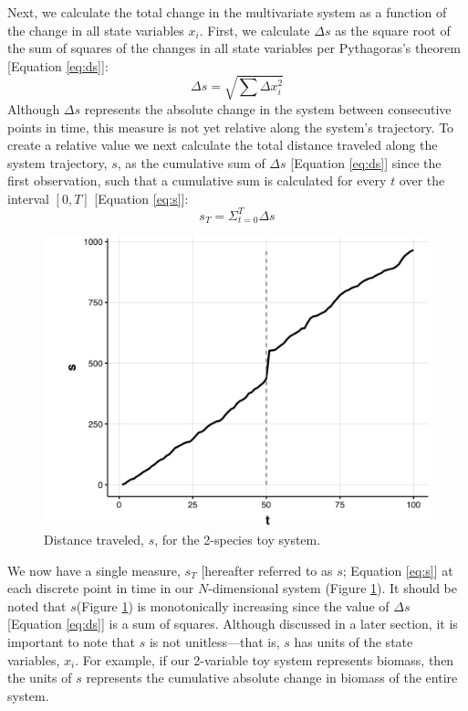 \documentclass[print]{nuthesis}
\begin{document}
Next, we calculate the total change in the multivariate system as a function of the change in all state variables \(x_i\). First, we calculate \(\Delta s\) as the square root of the sum of squares of the changes in all state variables per Pythagoras's theorem {[}Equation \eqref{eq:ds}{]}:
\begin{equation}
\Delta s = \sqrt{\sum{\Delta x_i^2}}
\label{eq:ds}
\end{equation}
Although \(\Delta s\) represents the absolute change in the system between consecutive points in time, this measure is not yet relative along the system's trajectory. To create a relative value we next calculate the total distance traveled along the system trajectory, \(s\), as the cumulative sum of \(\Delta s\) {[}Equation \eqref{eq:ds}{]} since the first observation, such that a cumulative sum is calculated for every \(t\) over the interval \([0,T]\) {[}Equation \eqref{eq:s}{]}:
\begin{equation}
s_T = \Sigma_{t=0}^{T}{\Delta s}
  \label{eq:s}
\end{equation}
\begin{figure}
\includegraphics[width=0.85\linewidth]{./chapterFiles/velocity/figsCalledInDiss/sysExs} \caption{Distance traveled, $s$, for the 2-species toy system.}\label{fig:sysExs}
\end{figure}
We now have a single measure, \(s_T\) {[}hereafter referred to as \(s\); Equation \eqref{eq:s}{]} at each discrete point in time in our \(N\)-dimensional system (Figure \ref{fig:sysExs}). It should be noted that \(s\)(Figure \ref{fig:sysExs}) is monotonically increasing since the value of \(\Delta s\) {[}Equation \eqref{eq:ds}{]} is a sum of squares. Although discussed in a later section, it is important to note that \(s\) is not unitless---that is, \(s\) has units of the state variables, \(x_i\). For example, if our 2-variable toy system represents biomass, then the units of \(s\) represents the cumulative absolute change in biomass of the entire system.
\end{document}

